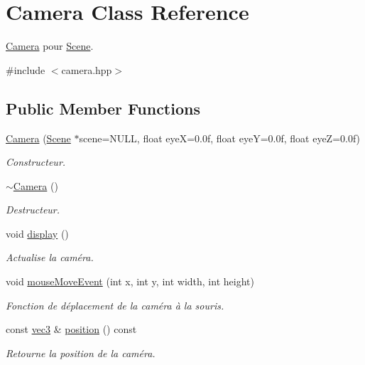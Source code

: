 \hypertarget{class_camera}{\section{Camera Class Reference}
\label{class_camera}
}


\hyperlink{class_camera}{Camera} pour \hyperlink{class_scene}{Scene}.  




{\ttfamily \#include $<$camera.\+hpp$>$}

\subsection*{Public Member Functions}
\begin{DoxyCompactItemize}
\item 
\hyperlink{class_camera_a1a8ac754efe577c8abbc1e19cc8bca25}{Camera} (\hyperlink{class_scene}{Scene} $\ast$scene=N\+U\+L\+L, float eye\+X=0.\+0f, float eye\+Y=0.\+0f, float eye\+Z=0.\+0f)
\begin{DoxyCompactList}\small\item\em Constructeur. \end{DoxyCompactList}\item 
\hyperlink{class_camera_ad1897942d0ccf91052386388a497349f}{$\sim$\+Camera} ()
\begin{DoxyCompactList}\small\item\em Destructeur. \end{DoxyCompactList}\item 
void \hyperlink{class_camera_adbfdac30f082ddea86183c1c31493946}{display} ()
\begin{DoxyCompactList}\small\item\em Actualise la caméra. \end{DoxyCompactList}\item 
void \hyperlink{class_camera_a22aaf20b581d402e5c3952655b830c0f}{mouse\+Move\+Event} (int x, int y, int width, int height)
\begin{DoxyCompactList}\small\item\em Fonction de déplacement de la caméra à la souris. \end{DoxyCompactList}\item 
const \hyperlink{structvec3}{vec3} \& \hyperlink{class_camera_ad42b0114b12a48474ae6c8be1c44e7bb}{position} () const 
\begin{DoxyCompactList}\small\item\em Retourne la position de la caméra. \end{DoxyCompactList}\end{DoxyCompactItemize}
